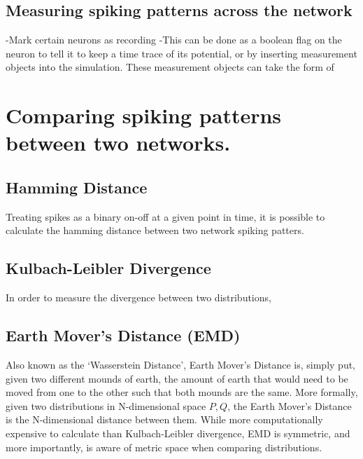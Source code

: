 \subsection{Measuring spiking patterns across the network}

-Mark certain neurons as recording
-This can be done as a boolean flag on the neuron to tell it to keep a time
trace of its potential, or by inserting measurement objects into the simulation.
These measurement objects can take the form of 

\section{Comparing spiking patterns between two networks.}

\subsection{Hamming Distance}
Treating spikes as a binary on-off at a given point in time, it is possible to
calculate the hamming distance between two network spiking patters. 

\subsection{Kulbach-Leibler Divergence}

In order to measure the divergence between two distributions, 

\subsection{Earth Mover's Distance (EMD)}

Also known as the `Wasserstein Distance', Earth Mover's Distance is, simply put,
given two different mounds of earth, the amount of earth that would need to be
moved from one to the other such that both mounds are the same. More formally,
given two distributions in N-dimensional space $P, Q$, the Earth Mover's
Distance is the N-dimensional distance between them. While more computationally
expensive to calculate than Kulbach-Leibler divergence, EMD is symmetric, and
more importantly, is aware of metric space when comparing distributions.

